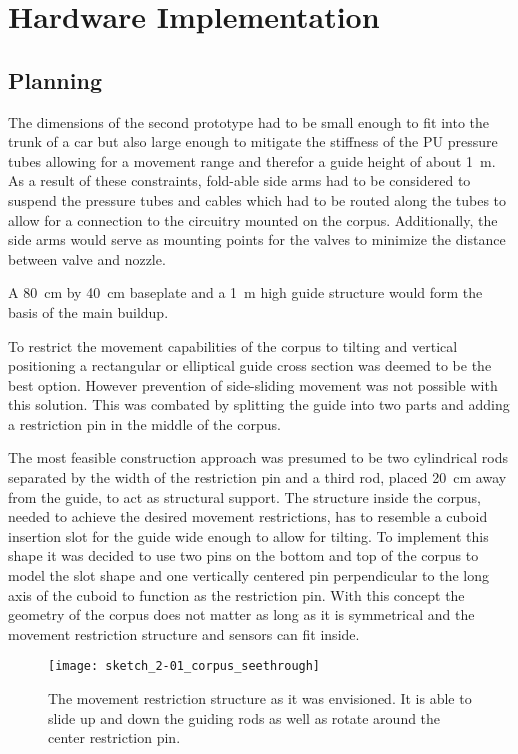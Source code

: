 \section{Hardware Implementation}
\author{Sebastian Schaffler}

\subsection{Planning}
The dimensions of the second prototype had to be small enough to fit into the trunk of a car but also large enough to mitigate the stiffness of the PU pressure tubes allowing for a movement range and therefor a guide height of about \SI{1}{\meter}. As a result of these constraints, fold-able side arms had to be considered to suspend the pressure tubes and cables which had to be routed along the tubes to allow for a connection to the circuitry mounted on the corpus. Additionally, the side arms would serve as mounting points for the valves to minimize the distance between valve and nozzle.

A \SI{80}{\centi\meter} by \SI{40}{\centi\meter} baseplate and a \SI{1}{\meter} high guide structure would form the basis of the main buildup. 

To restrict the movement capabilities of the corpus to tilting and vertical positioning a rectangular or elliptical guide cross section was deemed to be the best option. However prevention of side-sliding movement was not possible with this solution. This was combated by splitting the guide into two parts and adding a restriction pin in the middle of the corpus. 

The most feasible construction approach was presumed to be two cylindrical rods separated by the width of the restriction pin and a third rod, placed \SI{20}{\centi\meter} away from the guide, to act as structural support. The structure inside the corpus, needed to achieve the desired movement restrictions, has to resemble a cuboid insertion slot for the guide wide enough to allow for tilting. To implement this shape it was decided to use two pins on the bottom and top of the corpus to model the slot shape and one vertically centered pin perpendicular to the long axis of the cuboid to function as the restriction pin. With this concept the geometry of the corpus does not matter as long as it is symmetrical and the movement restriction structure and sensors can fit inside.

\begin{figure}[H]
\centering

\texttt{[image: sketch\_2-01\_corpus\_seethrough]}

\caption{The movement restriction structure as it was envisioned. It is able to slide up and down the guiding rods as well as rotate around the center restriction pin.}
\end{figure}

